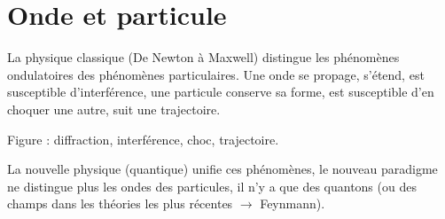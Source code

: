 \section{Onde et particule}
La physique classique (De Newton à Maxwell) distingue les phénomènes ondulatoires des phénomènes particulaires. Une onde se propage, s'étend, est susceptible d'interférence, une particule conserve sa forme, est susceptible d'en choquer une autre, suit une trajectoire.

\begin{center}
{\sf Figure : diffraction, interférence, choc, trajectoire.}
\end{center}

La nouvelle physique (quantique) unifie ces phénomènes, le nouveau paradigme ne distingue plus les ondes des particules, il n'y a que des quantons (ou des champs dans les théories les plus récentes $\to$ Feynmann).


